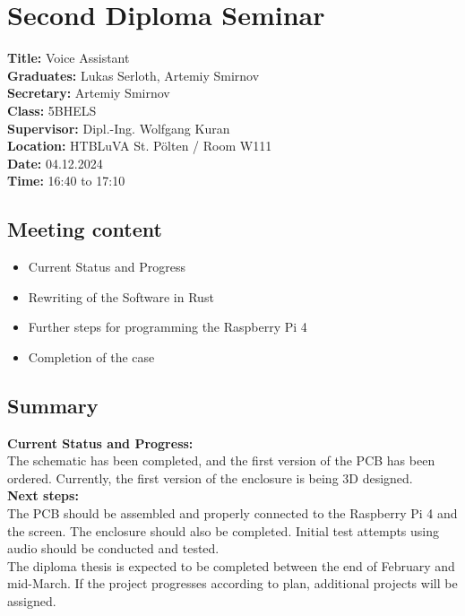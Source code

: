 
\section{Second Diploma Seminar}
\textbf{Title:} Voice Assistant\\

\noindent\textbf{Graduates:} Lukas Serloth, Artemiy Smirnov\\

\noindent\textbf{Secretary:} Artemiy Smirnov\\

\noindent\textbf{Class:} 5BHELS\\

\noindent\textbf{Supervisor:} Dipl.-Ing. Wolfgang Kuran\\

\noindent\textbf{Location:} HTBLuVA St. Pölten / Room W111\\

\noindent\textbf{Date:} 04.12.2024\\

\noindent\textbf{Time:} 16:40 to 17:10\\ 

\subsection{Meeting content}
\begin{itemize}
    \item Current Status and Progress
    \item Rewriting of the Software in Rust
    \item Further steps for programming the Raspberry Pi 4
    \item Completion of the case
\end{itemize}


\subsection{Summary}
\textbf{Current Status and Progress:\\} 
The schematic has been completed, and the first version of the PCB has been ordered. Currently, the first version of the enclosure is being 3D designed.\\

\noindent\textbf{Next steps:\\}
The PCB should be assembled and properly connected to the Raspberry Pi 4 and the screen. The enclosure should also be completed. Initial test attempts using audio should be conducted and tested.\\The diploma thesis is expected to be completed between the end of February and mid-March. If the project progresses according to plan, additional projects will be assigned.
